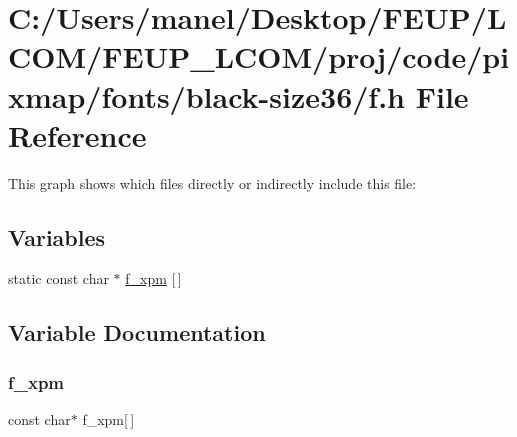 \hypertarget{black-size36_2f_8h}{}\section{C\+:/\+Users/manel/\+Desktop/\+F\+E\+U\+P/\+L\+C\+O\+M/\+F\+E\+U\+P\+\_\+\+L\+C\+O\+M/proj/code/pixmap/fonts/black-\/size36/f.h File Reference}
\label{black-size36_2f_8h}
This graph shows which files directly or indirectly include this file\+:
\subsection*{Variables}
\begin{DoxyCompactItemize}
\item 
static const char $\ast$ \mbox{\hyperlink{black-size36_2f_8h_a7c4c44893c8230458d58ebd576b6c358}{f\+\_\+xpm}} \mbox{[}$\,$\mbox{]}
\end{DoxyCompactItemize}


\subsection{Variable Documentation}
\mbox{\label{black-size36_2f_8h_a7c4c44893c8230458d58ebd576b6c358}} 
\subsubsection{\texorpdfstring{f\_xpm}{f\_xpm}}
{\footnotesize\ttfamily const char$\ast$ f\+\_\+xpm\mbox{[}$\,$\mbox{]}\hspace{0.3cm}{\ttfamily [static]}}

